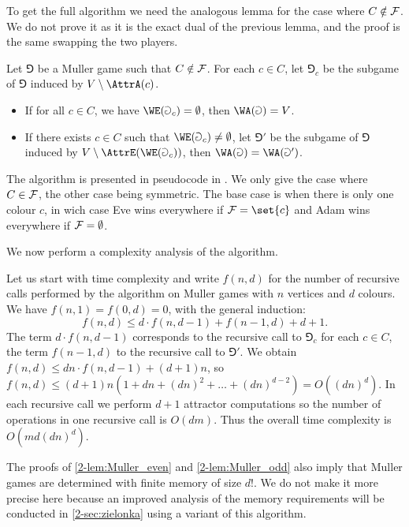 To get the full algorithm we need the analogous lemma for the case where $C \notin \mathcal{F}$.
We do not prove it as it is the exact dual of the previous lemma, and the proof is the same swapping the two players.

\begin{lemma}
\label{2-lem:Muller_odd}
Let $\Game$ be a Muller game such that $C \notin \mathcal{F}$.
For each $c \in C$, let $\Game_c$ be the subgame of $\Game$ induced by $V \setminus \AttrA(c)$.
\begin{itemize}
	\item If for all $c \in C$, we have $\WE(\Game_c) = \emptyset$, then $\WA(\Game) = V$.
	\item If there exists $c \in C$ such that $\WE(\Game_c) \neq \emptyset$,
	let $\Game'$ be the subgame of $\Game$ induced by $V \setminus \AttrE( \WE(\Game_c) )$,
	then $\WA(\Game) = \WA(\Game')$.	
\end{itemize}
\end{lemma}

The algorithm is presented in pseudocode in .
We only give the case where $C \in \mathcal{F}$, the other case being symmetric.
The base case is when there is only one colour $c$, in wich case Eve wins everywhere if $\F = \set{c}$
and Adam wins everywhere if $\mathcal{F} = \emptyset$.

We now perform a complexity analysis of the algorithm.

Let us start with time complexity and write $f(n,d)$ for the number of recursive calls performed by the algorithm on Muller games with $n$ vertices and $d$ colours.
We have $f(n,1) = f(0,d) = 0$, with the general induction:
\[
f(n,d) \le d \cdot f(n,d-1) + f(n-1,d) + d + 1.
\]
The term $d \cdot f(n,d-1)$ corresponds to the recursive call to $\Game_c$ for each $c \in C$,
the term $f(n-1,d)$ to the recursive call to $\Game'$.
We obtain $f(n,d) \le d n \cdot f(n,d-1) + (d+1)n$,
so $f(n,d) \le (d+1)n (1 + dn + (dn)^2 + \dots + (dn)^{d-2}) = O((dn)^d)$.
In each recursive call we perform $d+1$ attractor computations so the number of operations in one recursive call is $O(dm)$.
Thus the overall time complexity is $O(m d (dn)^d)$.


The proofs of \cref{2-lem:Muller_even} and \cref{2-lem:Muller_odd} also imply that Muller games are determined with finite memory of size $d!$.
We do not make it more precise here because an improved analysis of the memory requirements will be conducted in \cref{2-sec:zielonka}
using a variant of this algorithm.

